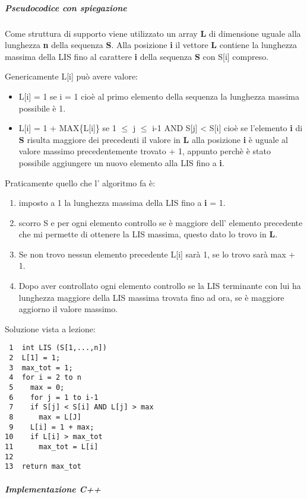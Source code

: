 \documentclass[11pt]{article}
\begin{document}
\subparagraph{Pseudocodice con spiegazione}
\label{sec:orgfaf9003}

Come struttura di supporto viene utilizzato un array \textbf{L} di dimensione uguale alla
lunghezza \textbf{n} della sequenza \textbf{S}.
Alla posizione \textbf{i} il vettore \textbf{L} contiene la lunghezza massima della LIS fino al
carattere \textbf{i} della sequenza \textbf{S} con S[i] compreso.

Genericamente L[i] può avere valore:
\begin{itemize}
\item L[i] = 1 se i = 1\newline
cioè al primo elemento della sequenza la lunghezza massima possibile è 1.
\item L[i] = 1 + MAX\{L[i]\} se 1 \(\le\) j \(\le\) i-1 AND S[j] < S[i] \newline
cioè se l'elemento \textbf{i} di \textbf{S} risulta maggiore dei precedenti il valore in \textbf{L} alla posizione \textbf{i}
è uguale al valore massimo precedentemente trovato + 1, appunto perchè è stato possibile aggiungere
un nuovo elemento alla LIS fino a \textbf{i}.
\end{itemize}

Praticamente quello che l' algoritmo fa è:
\begin{enumerate}
\item imposto a 1 la lunghezza massima della LIS fino a \textbf{i} = 1.
\item scorro S e per ogni elemento controllo se è maggiore dell' elemento precedente che mi permette
di ottenere la LIS massima, questo dato lo trovo in \textbf{L}.
\item Se non trovo nessun elemento precedente L[i] sarà 1, se lo trovo sarà max + 1.
\item Dopo aver controllato ogni elemento controllo se la LIS terminante con lui ha lunghezza maggiore della
LIS massima trovata fino ad ora, se è maggiore aggiorno il valore massimo.
\end{enumerate}

Soluzione vista a lezione:
\begin{verbatim}
 1  int LIS (S[1,...,n])
 2  L[1] = 1;
 3  max_tot = 1;
 4  for i = 2 to n
 5    max = 0;
 6    for j = 1 to i-1
 7    if S[j] < S[i] AND L[j] > max
 8      max = L[J]
 9    L[i] = 1 + max;
10    if L[i] > max_tot
11      max_tot = L[i]
12  
13  return max_tot
\end{verbatim}


\subparagraph{Implementazione C++}
\label{sec:org3ee0ab0}
\end{document}

